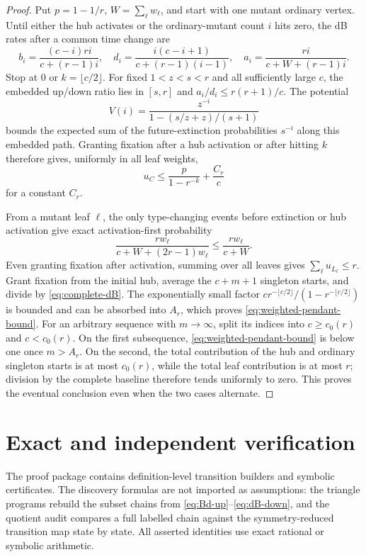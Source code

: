 \documentclass[11pt]{article}
\theoremstyle{definition}
\theoremstyle{remark}
\begin{document}
\begin{proof}
Put $p=1-1/r$, $W=\sum_\ell w_\ell$, and start with one mutant ordinary
vertex.  Until either the hub activates or the ordinary-mutant count $i$
hits zero, the dB rates after a common time change are
\[
 b_i=\frac{(c-i)ri}{c+(r-1)i},\quad
 d_i=\frac{i(c-i+1)}{c+(r-1)(i-1)},\quad
 a_i=\frac{ri}{c+W+(r-1)i}.
\]
Stop at $0$ or $k=\lfloor c/2\rfloor$.  For fixed $1<z<s<r$ and all
sufficiently large $c$, the embedded up/down ratio lies in $[s,r]$ and
$a_i/d_i\leq r(r+1)/c$.  The potential
\[
 V(i)=\frac{z^{-i}}{1-(s/z+z)/(s+1)}
\]
bounds the expected sum of the future-extinction probabilities $s^{-i}$
along this embedded path.  Granting fixation after a hub activation or
after hitting $k$ therefore gives, uniformly in all leaf weights,
\[
 u_C\leq\frac{p}{1-r^{-k}}+\frac{C_r}{c}
\]
for a constant $C_r$.

From a mutant leaf $\ell$, the only type-changing events before extinction
or hub activation give exact activation-first probability
\[
 \frac{r w_\ell}{c+W+(2r-1)w_\ell}
 \leq\frac{r w_\ell}{c+W}.
\]
Even granting fixation after activation, summing over all leaves gives
$\sum_\ell u_{L_\ell}\leq r$.  Grant fixation from the initial hub, average
the $c+m+1$ singleton starts, and divide by
\eqref{eq:complete-dB}.  The exponentially small factor
$c r^{-\lfloor c/2\rfloor}/(1-r^{-\lfloor c/2\rfloor})$ is bounded and can
be absorbed into $A_r$, which proves \eqref{eq:weighted-pendant-bound}.
For an arbitrary sequence with $m\to\infty$, split its indices into
$c\geq c_0(r)$ and $c<c_0(r)$.  On the first subsequence,
\eqref{eq:weighted-pendant-bound} is below one once $m>A_r$.  On the second,
the total contribution of the hub and ordinary singleton starts is at most
$c_0(r)$, while the total leaf contribution is at most $r$; division by the
complete baseline therefore tends uniformly to zero.  This proves the
eventual conclusion even when the two cases alternate.
\end{proof}

\section{Exact and independent verification}

The proof package contains definition-level transition builders and symbolic
certificates.  The discovery formulas are not imported as assumptions: the
triangle programs rebuild the subset chains from
\eqref{eq:Bd-up}--\eqref{eq:dB-down}, and the quotient audit compares a full
labelled chain against the symmetry-reduced transition map state by state.
All asserted identities use exact rational or symbolic arithmetic.
\end{document}
